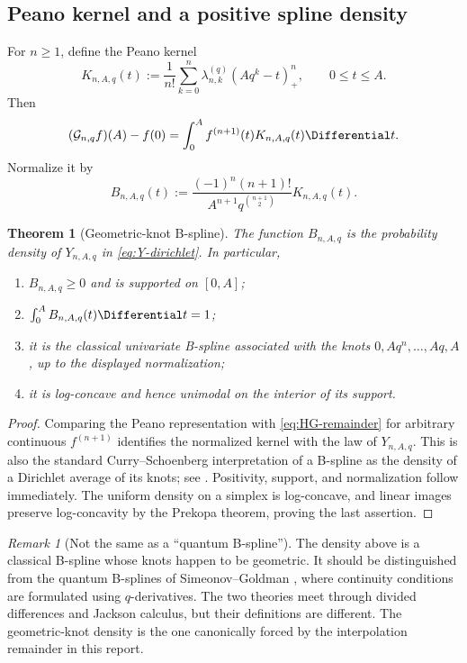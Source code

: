 \documentclass[11pt,oneside]{article}
\numberwithin{equation}{section}
\newtheorem{theorem}{Theorem}[section]
\theoremstyle{definition}
\theoremstyle{remark}
\newtheorem{remark}[remark]{Remark}
\newcommand{\Gc}{\mathcal G}
\begin{document}
\subsection{Peano kernel and a positive spline density}

For $n\ge1$, define the Peano kernel
\begin{equation}
 K_{n,A,q}(t):=\frac1{n!}\sum_{k=0}^n
 \lambda_{n,k}^{(q)}(Aq^k-t)_+^n,
 \qquad 0\le t\le A.
 \label{eq:Peano-kernel}
\end{equation}
Then
\[
 (\Gc_{n,q}f)(A)-f(0)=\int_0^Af^{(n+1)}(t)K_{n,A,q}(t)\Differential t.
\]
Normalize it by
\begin{equation}
 B_{n,A,q}(t):=
 \frac{(-1)^n(n+1)!}{A^{n+1}q^{\binom{n+1}{2}}}K_{n,A,q}(t).
 \label{eq:B-density}
\end{equation}

\begin{theorem}[Geometric-knot B-spline]
The function $B_{n,A,q}$ is the probability density of
$Y_{n,A,q}$ in \eqref{eq:Y-dirichlet}.  In particular,
\begin{enumerate}[label=(\roman*),leftmargin=2em]
\item $B_{n,A,q}\ge0$ and is supported on $[0,A]$;
\item $\int_0^AB_{n,A,q}(t)\Differential t=1$;
\item it is the classical univariate B-spline associated with the knots
$0,Aq^n,\ldots,Aq,A$, up to the displayed normalization;
\item it is log-concave and hence unimodal on the interior of its support.
\end{enumerate}
\end{theorem}

\begin{proof}
Comparing the Peano representation with \eqref{eq:HG-remainder} for arbitrary
continuous $f^{(n+1)}$ identifies the normalized kernel with the law of
$Y_{n,A,q}$.  This is also the standard Curry--Schoenberg interpretation of a
B-spline as the density of a Dirichlet average of its knots; see
\cite{deBoor}.  Positivity, support, and normalization follow immediately.
The uniform density on a simplex is log-concave, and linear images preserve
log-concavity by the Prekopa theorem, proving the last assertion.
\end{proof}

\begin{remark}[Not the same as a ``quantum B-spline'']
The density above is a classical B-spline whose knots happen to be geometric.
It should be distinguished from the quantum B-splines of
Simeonov--Goldman \cite{SimeonovGoldman}, where continuity conditions are
formulated using $q$-derivatives.  The two theories meet through divided
differences and Jackson calculus, but their definitions are different.  The
geometric-knot density is the one canonically forced by the interpolation
remainder in this report.
\end{remark}
\end{document}
